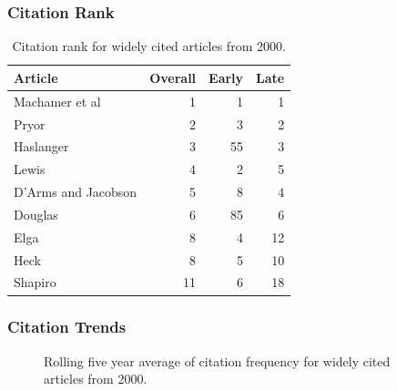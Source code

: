 \documentclass[
  10pt,
  letterpaper,
  DIV=11,
  numbers=noendperiod,
  twoside]{scrartcl}
\begin{document}
\subsubsection*{Citation Rank}\label{sec-rank-2000}

\begin{longtable}[]{@{}lrrr@{}}

\caption{\label{tbl-citation-rank-2000}Citation rank for widely cited
articles from 2000.}

\tabularnewline

\toprule\noalign{}
Article & Overall & Early & Late \\
\midrule\noalign{}
\endhead
\bottomrule\noalign{}
\endlastfoot
Machamer et al & 1 & 1 & 1 \\
Pryor & 2 & 3 & 2 \\
Haslanger & 3 & 55 & 3 \\
Lewis & 4 & 2 & 5 \\
D'Arms and Jacobson & 5 & 8 & 4 \\
Douglas & 6 & 85 & 6 \\
Elga & 8 & 4 & 12 \\
Heck & 8 & 5 & 10 \\
Shapiro & 11 & 6 & 18 \\

\end{longtable}

\subsubsection*{Citation Trends}\label{sec-trends-2000}

\begin{figure}


\caption{\label{fig-citation-spaghetti-2000}Rolling five year average of
citation frequency for widely cited articles from 2000.}

\end{figure}%
\end{document}
